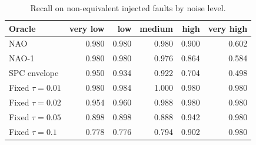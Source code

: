 \begin{table}[t]
\centering
\caption{Recall on non-equivalent injected faults by noise level.}
\label{tab:rq4-recall-noise}
\small
\begin{tabular}{lrrrrr}
\toprule
Oracle & very low & low & medium & high & very high \\
\midrule
NAO & 0.980 & 0.980 & 0.980 & 0.900 & 0.602 \\
NAO-1 & 0.980 & 0.980 & 0.976 & 0.864 & 0.584 \\
SPC envelope & 0.950 & 0.934 & 0.922 & 0.704 & 0.498 \\
Fixed $\tau=0.01$ & 0.980 & 0.984 & 1.000 & 0.980 & 0.980 \\
Fixed $\tau=0.02$ & 0.954 & 0.960 & 0.988 & 0.980 & 0.980 \\
Fixed $\tau=0.05$ & 0.898 & 0.898 & 0.888 & 0.942 & 0.980 \\
Fixed $\tau=0.1$ & 0.778 & 0.776 & 0.794 & 0.902 & 0.980 \\
\bottomrule
\end{tabular}
\end{table}
